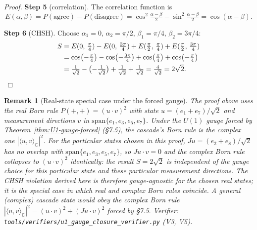 \documentclass[12pt,a4paper]{article}
\newtheorem{remark}[theorem]{Remark}
\begin{document}
\begin{proof}
\textbf{Step 5} (correlation). The correlation function is
\[
E(\alpha,\beta) = P(\text{agree})-P(\text{disagree})
= \cos^2\!\tfrac{\alpha-\beta}{2} - \sin^2\!\tfrac{\alpha-\beta}{2}
= \cos(\alpha-\beta).
\]

\textbf{Step 6} (CHSH). Choose $\alpha_1=0$, $\alpha_2=\pi/2$, $\beta_1=\pi/4$,
$\beta_2=3\pi/4$:
\begin{align*}
S &= E(0,\,\tfrac{\pi}{4}) - E(0,\,\tfrac{3\pi}{4})
+ E(\tfrac{\pi}{2},\,\tfrac{\pi}{4}) + E(\tfrac{\pi}{2},\,\tfrac{3\pi}{4})\\
&= \cos\bigl(-\tfrac{\pi}{4}\bigr) - \cos\bigl(-\tfrac{3\pi}{4}\bigr)
+ \cos\bigl(\tfrac{\pi}{4}\bigr) + \cos\bigl(-\tfrac{\pi}{4}\bigr)\\
&= \tfrac{1}{\sqrt{2}} - \bigl(-\tfrac{1}{\sqrt{2}}\bigr) + \tfrac{1}{\sqrt{2}}
+ \tfrac{1}{\sqrt{2}}
= \tfrac{4}{\sqrt{2}} = 2\sqrt{2}.\qedhere
\end{align*}
\end{proof}

\begin{remark}[Real-state special case under the forced gauge]\label{rem:bell-real-special-case}
The proof above uses the real Born rule $P(+,+) = (u\cdot v)^2$ with
state $u = (e_1+e_7)/\sqrt{2}$ and measurement directions $v$ in
$\mathrm{span}\{e_1, e_3, e_5, e_7\}$. Under the $U(1)$ gauge forced by
Theorem~\ref{thm:U1-gauge-forced} (\S7.5), the cascade's Born rule is
the complex one $|\langle u, v\rangle_{\mathbb{C}}|^2$. For the
particular states chosen in this proof, $Ju = (e_2+e_8)/\sqrt{2}$ has
no overlap with $\mathrm{span}\{e_1, e_3, e_5, e_7\}$, so
$Ju\cdot v = 0$ and the complex Born rule collapses to
$(u\cdot v)^2$ identically: the result $S = 2\sqrt{2}$ is independent
of the gauge choice for this particular state and these particular
measurement directions. The CHSH violation derived here is therefore
gauge-agnostic for the chosen real states; it is the special case in
which real and complex Born rules coincide. A general (complex)
cascade state would obey the complex Born rule
$|\langle u, v\rangle_{\mathbb{C}}|^2 = (u\cdot v)^2 + (Ju\cdot v)^2$
forced by \S7.5. Verifier:
\texttt{tools/verifiers/u1\_gauge\_closure\_verifier.py} (V3, V5).
\end{remark}
\end{document}
